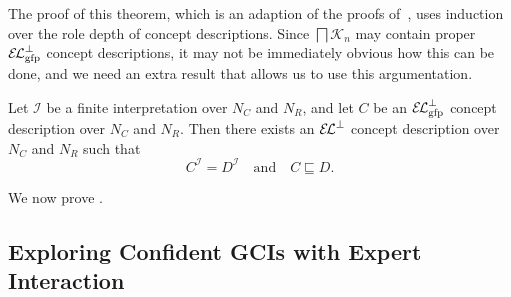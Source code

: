 The proof of this theorem, which is an adaption of the proofs of~\cite[Lemma~6.8,
Theorem~6.9]{Diss-Felix}, uses induction over the role depth of concept descriptions.
Since $\bigsqcap \mathcal{K}_{n}$ may contain proper ${{\mathcal{E}\kern-.3ex\mathcal{L}}_\text{gfp}^\bot}$ concept descriptions, it
may not be immediately obvious how this can be done, and we need an extra result that
allows us to use this argumentation.

\begin{Lemma}
  \label{lem:Felix-5.6}
  Let $\mathcal{I}$ be a finite interpretation over $N_{C}$ and $N_{R}$, and let $C$ be an
  ${{\mathcal{E}\kern-.3ex\mathcal{L}}_\text{gfp}^\bot}$ concept description over $N_{C}$ and $N_{R}$.  Then there exists an ${{\mathcal{E}\kern-.3ex\mathcal{L}}^\bot}$
  concept description over $N_{C}$ and $N_{R}$ such that
  \begin{equation*}
    C^{\mathcal{I}} = D^{\mathcal{I}} \quad\text{and}\quad C \sqsubseteq D.
  \end{equation*}
\end{Lemma}

We now prove .

\begin{Proof}
  
\end{Proof}

%

\subsection{Exploring Confident GCIs with Expert Interaction}
\label{sec:expl-conf-gcis-1}

%


